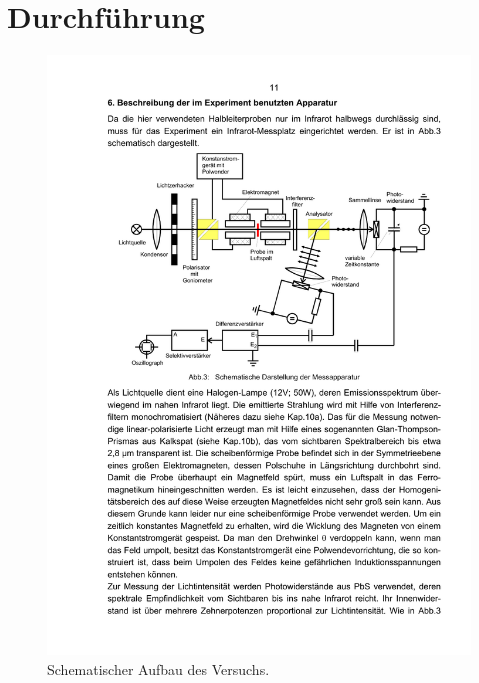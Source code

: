 \section{Durchführung}
\label{sec:Durchführung}

\begin{figure}[H]
    \centering
    \includegraphics[scale=0.35]{Abbildungen/Aufbau.pdf}
    \caption{Schematischer Aufbau des Versuchs.\cite{V46}}
    \label{fig:aufbau}
\end{figure}

